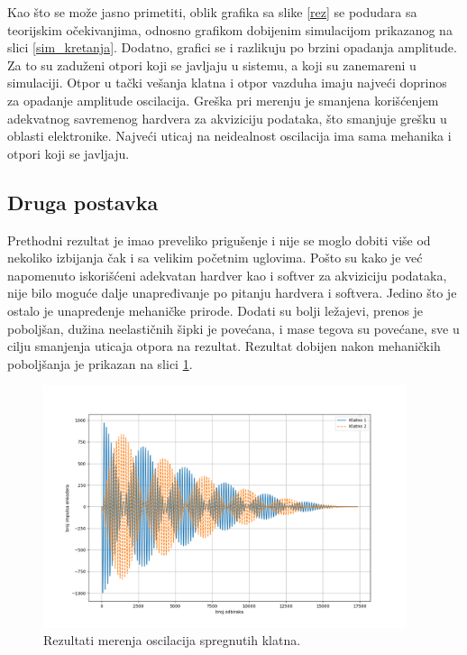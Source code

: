 \documentclass[a4paper, 12pt, diplomski]{etf}
\begin{document}
\noindent
Kao što se može jasno primetiti, oblik grafika sa slike \ref{rez} se podudara sa teorijskim očekivanjima, odnosno grafikom dobijenim simulacijom prikazanog na slici \ref{sim_kretanja}. Dodatno, grafici se i razlikuju po brzini opadanja amplitude. Za to su zaduženi otpori koji se javljaju u sistemu, a koji su zanemareni u simulaciji. Otpor u tački vešanja klatna i otpor vazduha imaju najveći doprinos za opadanje amplitude oscilacija. Greška pri merenju je smanjena korišćenjem adekvatnog savremenog hardvera za akviziciju podataka, što smanjuje grešku u oblasti elektronike. Najveći uticaj na neidealnost oscilacija ima sama mehanika i otpori koji se javljaju.


\subsection{Druga postavka}

Prethodni rezultat je imao preveliko prigušenje i nije se moglo dobiti više od nekoliko izbijanja čak i sa velikim početnim uglovima. Pošto su kako je već napomenuto iskorišćeni adekvatan hardver kao i softver za akviziciju podataka, nije bilo moguće dalje unapređivanje po pitanju hardvera i softvera. Jedino što je ostalo je unapređenje mehaničke prirode. Dodati su bolji ležajevi, prenos je poboljšan, dužina neelastičnih šipki je povećana, i mase tegova su povećane, sve u cilju smanjenja uticaja otpora na rezultat. Rezultat dobijen nakon mehaničkih poboljšanja je prikazan na slici \ref{rez2}.

\begin{figure}[h!]
    \centering
    \includegraphics[width=0.95\textwidth]{py_rez/klatno_2.png}
    \caption{Rezultati merenja oscilacija spregnutih klatna.}
    \label{rez2}
\end{figure}
\end{document}
